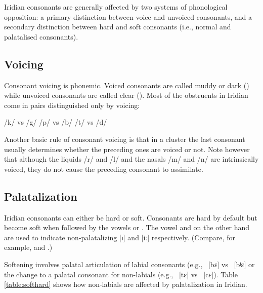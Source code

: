 Iridian consonants are generally affected by two systems of phonological
opposition: a primary distinction between voice and unvoiced consonants, and a
secondary distinction between hard and soft consonants (i.e., normal and
palatalised consonants).

\subsection{Voicing}
Consonant voicing is phonemic. Voiced consonants are called muddy or dark
() while unvoiced consonants are called clear ().
Most of the obstruents in Iridian come in pairs distinguished only by voicing:

\pex
\a /k/  vs /g/ 
\a /p/  vs /b/ 
\a /t/  vs /d/ 
\xe

Another basic rule of consonant voicing is that in a cluster the last consonant
usually determines whether the preceding ones are voiced or not. Note however that although the liquids /r/ and /l/ and the nasals
/m/ and /n/ are intrinsically voiced, they do not cause the preceding consonant
to assimilate.

\pex
\a{} \a{}
\a{} \a{}
\xe

\subsection{Palatalization}

Iridian consonants can either be hard or soft. Consonants are hard by default
but become soft when followed by the vowels  or . The vowel
 and  on the other hand are used to indicate non-palatalizing
[ɪ] and [iː] respectively. (Compare, for example,  and
.)

Softening involves palatal articulation of labial consonants (e.g.,
~[bɛ] vs ~[bʲɛ] or the change to a palatal consonant for
non-labials (e.g., ~[tɛ] vs ~[cɛ]). Table \ref{table:softhard}
shows how non-labials are affected by palatalization in Iridian.

